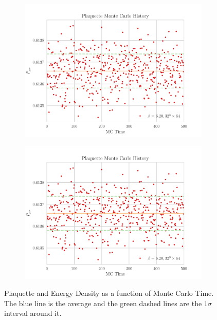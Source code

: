 \begin{figure}[hbt!]
    \centering
    \begin{subfigure}{0.45\textwidth}
        \includegraphics[width=\textwidth]{results/MCPlaq.pdf}
    \end{subfigure}
    \begin{subfigure}{0.45\textwidth}
        \includegraphics[width=\textwidth]{results/MCPlaq.pdf}
    \end{subfigure}
    \caption{\footnotesize Plaquette and Energy Density as a function of Monte Carlo Time. The blue line is the average and the green dashed lines are the $1\sigma$ interval around it. }
    \label{fig:MCPlaqEnerg}
\end{figure} 
